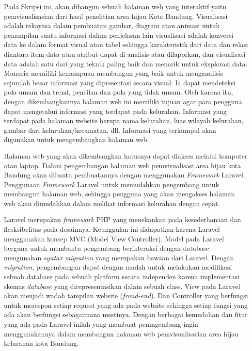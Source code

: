 Pada Skripsi ini, akan dibangun sebuah halaman web yang interaktif yaitu pemvisualisasian dari hasil penelitian area hijau Kota Bandung\cite{juan:22:pengumpulan}. Visualisasi adalah rekayasa dalam pembuatan gambar, diagram atau animasi untuk penampilan suatu informasi dalam penjelasan lain visualisasi adalah konversi data ke dalam format visual atau tabel sehingga karakteristik dari data dan relasi diantara item data atau atribut dapat di analisis atau dilaporkan, dan visualisasi data adalah satu dari yang teknik paling baik dan menarik untuk eksplorasi data. Manusia memiliki kemampuan membangun yang baik untuk menganalisis sejumlah besar informasi yang dipresentasi secara visual. Ia dapat mendeteksi pola umum dan trend, pencilan dan pola yang tidak umum. Oleh karena itu, dengan dikembangkannya halaman web ini memiliki tujuan agar para pengguna dapat mengetahui informasi yang terdapat pada kelurahan. Informasi yang terdapat pada halaman website berupa nama kelurahan, luas wilayah kelurahan, gambar dari keluruhan/kecamatan, dll. Informasi yang terkumpul akan digunakan untuk mengembangkan halaman web.


Halaman web yang akan dikembangkan harusnya dapat diakses melalui komputer atau laptop. Dalam pengembangan halaman web pemvisualisasi area hijau kota Bandung akan dibantu pembuatannya dengan menggunakan \emph{Framework} Laravel. Penggunaan \textit{Framework} Laravel untuk memudahkan pengembang untuk membangun halaman web, sehingga pengguna yang akan mengakses halaman web akan dimudahkan dalam melihat informasi kelurahan dengan cepat. 

Laravel merupakan \textit{framework} PHP yang menekankan pada kesederhanaan dan flesksibelitas pada desainnya. Keunggulan ini didapatkan karena Laravel menggunakan konsep MVC (Model View Controller). Model pada Laravel berguna untuk membantu pengembang berinteraksi dengan database mengunakan \textit{syntax migration} yang merupakan bawaan dari Laravel. Dengan \textit{migration}, pengembangan dapat dengan mudah untuk melakukan modifikasi sebuah database pada sebuah platform secara independen karena implementasi skemas \textit{database} yang direpresentasikan dalam sebuah class. View pada Laravel akan menjadi wadah tampilan website (\textit{frond-end}). Dan Controller yang berfungsi untuk merespon setiap request yang ada pada website sehingga setiap fungsi yang ada akan berfungsi sebagaimana mestinya. Dengan berbagai kemudahan dan fitur yang ada pada Laravel inilah yang membuat pemngembang ingin menggunakannya dalam membangun halaman web pemvisualisasian area hijau kelurahan kota Bandung.


